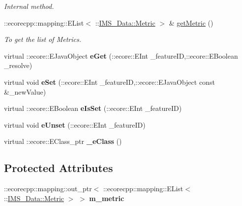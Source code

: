 \begin{DoxyCompactItemize}
\begin{DoxyCompactList}\small\item\em Internal method. \item\end{DoxyCompactList}\item 
::ecorecpp::mapping::EList$<$ ::\hyperlink{classIMS__Data_1_1Metric}{IMS\_\-Data::Metric} $>$ \& \hyperlink{classIMS__Data_1_1ListMetric_a973721dec12d66f4c31434e29b3e8eb7}{getMetric} ()
\begin{DoxyCompactList}\small\item\em To get the list of Metrics. \item\end{DoxyCompactList}\item 
\hypertarget{classIMS__Data_1_1ListMetric_a9438f64df61d1f61bc23e2a1cbc1c14d}{
virtual ::ecore::EJavaObject {\bfseries eGet} (::ecore::EInt \_\-featureID,::ecore::EBoolean \_\-resolve)}
\label{classIMS__Data_1_1ListMetric_a9438f64df61d1f61bc23e2a1cbc1c14d}

\item 
\hypertarget{classIMS__Data_1_1ListMetric_a4f5bf5d77aefda42a8435334fc91d2e8}{
virtual void {\bfseries eSet} (::ecore::EInt \_\-featureID,::ecore::EJavaObject const \&\_\-newValue)}
\label{classIMS__Data_1_1ListMetric_a4f5bf5d77aefda42a8435334fc91d2e8}

\item 
\hypertarget{classIMS__Data_1_1ListMetric_a7e1c7cc94d7a0171ed344d0bebea8afd}{
virtual ::ecore::EBoolean {\bfseries eIsSet} (::ecore::EInt \_\-featureID)}
\label{classIMS__Data_1_1ListMetric_a7e1c7cc94d7a0171ed344d0bebea8afd}

\item 
\hypertarget{classIMS__Data_1_1ListMetric_a75c836c2c0e0b08ce2b14c33a0d74241}{
virtual void {\bfseries eUnset} (::ecore::EInt \_\-featureID)}
\label{classIMS__Data_1_1ListMetric_a75c836c2c0e0b08ce2b14c33a0d74241}

\item 
\hypertarget{classIMS__Data_1_1ListMetric_a9828f7844b5120028bfc2af70430da89}{
virtual ::ecore::EClass\_\-ptr {\bfseries \_\-eClass} ()}
\label{classIMS__Data_1_1ListMetric_a9828f7844b5120028bfc2af70430da89}

\end{DoxyCompactItemize}
\subsection*{Protected Attributes}
\begin{DoxyCompactItemize}
\item 
\hypertarget{classIMS__Data_1_1ListMetric_a0f88d8935ca934ee6e4d2899f28539cd}{
::ecorecpp::mapping::out\_\-ptr$<$ ::ecorecpp::mapping::EList$<$ ::\hyperlink{classIMS__Data_1_1Metric}{IMS\_\-Data::Metric} $>$ $>$ {\bfseries m\_\-metric}}
\label{classIMS__Data_1_1ListMetric_a0f88d8935ca934ee6e4d2899f28539cd}

\end{DoxyCompactItemize}


